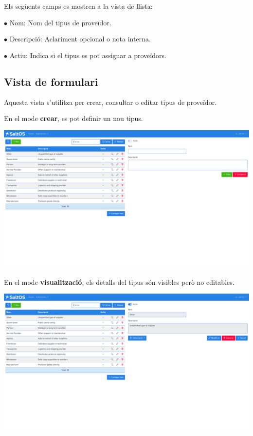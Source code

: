 \documentclass[a4paper]{article}
\begin{document}
Els següents camps es mostren a la vista de llista:

\begin{compactitem}
\item[\color{myblue}$\bullet$] Nom: Nom del tipus de proveïdor.
\item[\color{myblue}$\bullet$] Descripció: Aclariment opcional o nota interna.
\item[\color{myblue}$\bullet$] Actiu: Indica si el tipus es pot assignar a proveïdors.
\end{compactitem}

\hypertarget{toc134}{}
\subsection{Vista de formulari}

Aquesta vista s'utilitza per crear, consultar o editar tipus de proveïdor.

En el mode \textbf{crear}, es pot definir un nou tipus.

\begin{center}\includegraphics[width=1\textwidth]{../ujest/snaps/test-screenshots-js-screenshots-purchases-suppliers-types-create-ca-es-1-snap.png}\end{center}

En el mode \textbf{visualització}, els detalls del tipus són visibles però no editables.

\begin{center}\includegraphics[width=1\textwidth]{../ujest/snaps/test-screenshots-js-screenshots-purchases-suppliers-types-view-10-ca-es-1-snap.png}\end{center}
\end{document}
